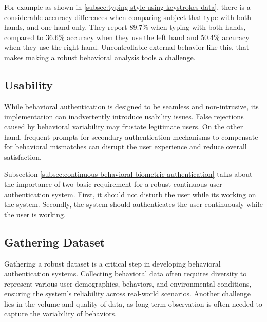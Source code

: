 For example as shown in \ref{subsec:typing-style-using-keystrokes-data}, 
there is a considerable accuracy differences when comparing subject that type with both hands, and one hand only. 
They report 89.7\% when typing with both hands, 
compared to 36.6\% accuracy when they use the left hand and 
50.4\% accuracy when they use the right hand. 
Uncontrollable external behavior like this, that makes making a robust behavioral analysis tools a challenge.

\subsection{Usability}
While behavioral authentication is designed to be seamless and non-intrusive, its implementation can inadvertently introduce usability issues. False rejections caused by behavioral variability may frustate legitimate users. On the other hand, frequent prompts for secondary authentication mechanisms to compensate for behavioral mismatches can disrupt the user experience and reduce overall satisfaction.

Subsection \ref{subsec:continuous-behavioral-biometric-authentication} talks about the importance of 
two basic requirement for a robust continuous user authentication system. 
First, it should not disturb the user while its working on the system. 
Secondly, the system should authenticates the user continuously while the user is working. 

\subsection{Gathering Dataset}

Gathering a robust dataset is a critical step in developing behavioral authentication systems.
Collecting behavioral data often requires diversity to represent various user demographics, behaviors, and environmental conditions, ensuring the system's reliability across real-world scenarios. 
Another challenge lies in the volume and quality of data, as long-term observation is often needed to capture the variability of behaviors.